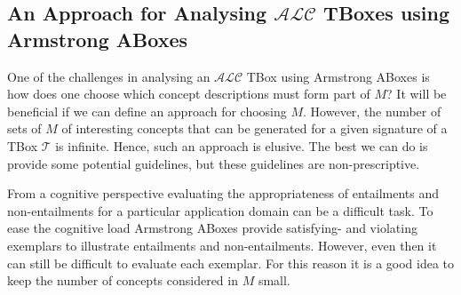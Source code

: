 \documentclass{amsart}
\begin{document}
 \subsection{An Approach for Analysing $\mathcal{ALC}$ TBoxes using Armstrong ABoxes}
  One of the challenges in analysing an $\mathcal{ALC}$ TBox using Armstrong ABoxes is how does one choose which concept descriptions must form part of $M$? It will be beneficial if we can define an approach for choosing $M$. However, the number of sets of $M$ of interesting concepts that can be generated for a given signature of a TBox $\mathcal{T}$ is infinite. Hence, such an approach is elusive. The best we can do is provide some potential guidelines, but these guidelines are non-prescriptive.
  
  
  From a cognitive perspective evaluating the appropriateness of entailments and non-entailments for a particular application domain can be a difficult task. To ease the cognitive load Armstrong ABoxes provide satisfying- and violating exemplars to illustrate entailments and non-entailments. However, even then it can still be difficult to evaluate each exemplar.  For this reason it is a good idea to keep the number of concepts considered in $M$ small. 
  
\end{document}
